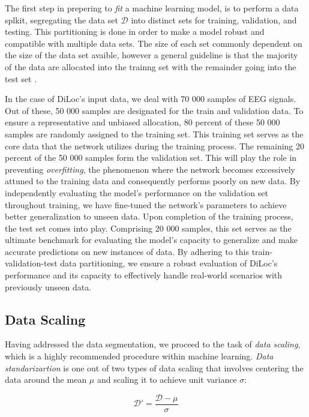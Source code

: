 \documentclass[a4paper, UKenglish, 11pt]{uiomaster}
\begin{document}
The first step in prepering to \emph{fit} a machine learning model, is to perform a data splkit, segregating the data set $\mathcal{D}$ into distinct sets for training, validation, and testing. This partitioning is done in order to make a model robust and compatible with multiple data sets. The size of each set commonly dependent on the size of the data set avaible, however a general guideline is that the majority of the data are allocated into the trainng set with the remainder going into the test set \cite{mehta2019high}.

In the case of DiLoc's input data, we deal with 70 000 samples of EEG signals. Out of these, 50 000 samples are designated for the train and validation data. To ensure a representative and unbiased allocation, 80 percent of these 50 000 samples are randomly assigned to the training set. This training set serves as the core data that the network utilizes during the training process. The remaining 20 percent of the 50 000 samples form the validation set. This will play the role in preventing \emph{overfitting}, the phenomenon where the network becomes excessively attuned to the training data and consequently performs poorly on new data. By independently evaluating the model's performance on the validation set throughout training, we have fine-tuned the network's parameters to achieve better generalization to unseen data.
Upon completion of the training process, the test set comes into play. Comprising 20 000 samples, this set serves as the ultimate benchmark for evaluating the model's capacity to generalize and make accurate predictions on new instances of data. By adhering to this train-validation-test data partitioning, we ensure a robust evaluation of DiLoc's performance and its capacity to effectively handle real-world scenarios with previously unseen data.

\subsection{Data Scaling}
Having addressed the data segmentation, we proceed to the task of \emph{data scaling}, which is a highly recommended procedure within machine learning. \emph{Data standarizartion} is one out of two types of data scaling that involves centering the data around the mean $\mu$ and scaling it to achieve unit variance $\sigma$:

\begin{equation}
\mathcal{D}' = \frac{\mathcal{D} - \mu}{\sigma}
\end{equation}
\end{document}
